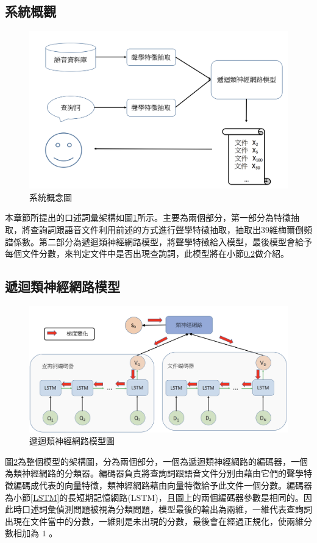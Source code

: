\subsection{系統概觀}
\begin{figure}[h]
\centering
\includegraphics[scale=0.4]{images/ch3_system.png} 
\caption{系統概念圖}
\label{ch3_system}
\end{figure}
本章節所提出的口述詞彙架構如圖\ref{ch3_system}所示。主要為兩個部分，第一部分為特徵抽取，將查詢詞跟語音文件利用前述的方式進行聲學特徵抽取，抽取出$ 39 $維梅爾倒頻譜係數。第二部分為遞迴類神經網路模型，將聲學特徵給入模型，最後模型會給予每個文件分數，來判定文件中是否出現查詢詞，此模型將在小節\ref{rnn_model}做介紹。
\subsection{遞迴類神經網路模型}
\label{rnn_model}
\begin{figure}[ht]
\centering
\includegraphics[scale=0.4]{images/ch3_RNN_model_g.png} 
\caption{遞迴類神經網路模型圖}
\label{ch3_RNN_model}
\end{figure}
圖\ref{ch3_RNN_model}為整個模型的架構圖，分為兩個部分，一個為遞迴類神經網路的編碼器，一個為類神經網路的分類器。編碼器負責將查詢詞跟語音文件分別由藉由它們的聲學特徵編碼成代表的向量特徵，類神經網路藉由向量特徵給予此文件一個分數。編碼器為小節\ref{LSTM}的長短期記憶網路(LSTM)，且圖上的兩個編碼器參數是相同的。因此時口述詞彙偵測問題被視為分類問題，模型最後的輸出為兩維，一維代表查詢詞出現在文件當中的分數，一維則是未出現的分數，最後會在經過正規化，使兩維分數相加為 $ 1 $ 。

